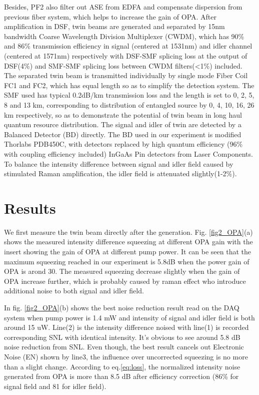 \documentclass[9pt,twocolumn,twoside]{osajnl}
\begin{document}
Besides, PF2 also filter out ASE from EDFA and compensate dispersion from previous fiber system, which helps to increase the gain of OPA.
After amplification in DSF, twin beams are generated and separated by 15nm bandwidth Coarse Wavelength Division Multiplexer (CWDM), which has 90\% and 86\% transmission efficiency in signal (centered at 1531nm) and idler channel (centered at 1571nm)  respectively with DSF-SMF splicing loss at the output of DSF(4\%) and SMF-SMF splicing loss between CWDM filters(<1\%) included.
The separated twin beam is transmitted individually by single mode Fiber Coil FC1 and FC2, which has equal length so as to simplify the detection system.
The SMF used has typical 0.2dB/km transmission loss and the length is set to 0, 2, 5, 8 and 13 km, corresponding to distribution of entangled source by 0, 4, 10, 16, 26 km respectively, so as to demonstrate the potential of twin beam in long haul quantum resource distribution.
The signal and idler of twin are detected by a Balanced Detector (BD) directly. The BD used in our experiment is modified Thorlabs PDB450C, with detectors replaced by high quantum efficiency (96\% with coupling efficiency included) InGaAs Pin detectors from Laser Components.
To balance the intensity difference between signal and idler field caused by stimulated Raman amplification, the idler field is attenuated slightly(1-2\%)\cite{guo12}.


\section{Results}

We first measure the twin beam directly after the generation.
Fig. \ref{fig2_OPA}(a) shows the measured intensity difference squeezing at different OPA gain with the insert showing the gain of OPA at different pump power.
It can be seen that the maximum squeezing reached in our experiment is 5.8dB when the power gain of OPA is arond 30.
The measured squeezing decrease slightly when the gain of OPA increase further, which is probably caused by raman effect who introduce additional noise to both signal and idler field.

In fig. \ref{fig2_OPA}(b) shows the best noise reduction result read on the DAQ system when pump power is 1.4 mW and intensity of signal and idler field is both around 15 uW. Line(2) is the intensity difference noised with line(1) is recorded corresponding SNL with identical intensity. It's obvious to see around 5.8 dB noise reduction from SNL. Even though, the best result cancels out Electronic Noise (EN) shown by line3, the influence over uncorrected squeezing is no more than a slight change. According to eq.\ref{eq:loss}, the normalized intensity noise generated from OPA is more than 8.5 dB after efficiency correction%
(86\% for signal field and 81 for idler field).	
\end{document}
